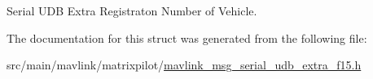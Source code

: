 Serial U\+D\+B Extra Registraton Number of Vehicle. 



The documentation for this struct was generated from the following file\+:\begin{DoxyCompactItemize}
\item 
src/main/mavlink/matrixpilot/\hyperlink{mavlink__msg__serial__udb__extra__f15_8h}{mavlink\+\_\+msg\+\_\+serial\+\_\+udb\+\_\+extra\+\_\+f15.\+h}\end{DoxyCompactItemize}
